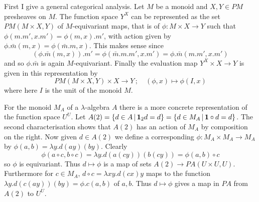 \documentclass[12pt, amstex, amssymb]{article}
\newcommand{\app}{{\bf 1}}
\begin{document}
First I give a general categorical analysis. Let $M$ be a monoid
and $X,Y \in PM$ presheaves on $M$. The function space
$Y^X$ can be represented as the set $PM(M \times X, Y)$ of
$M$-equivariant maps, that is of $\phi:M \times X \to Y$
such that $\phi(m.m',x.m') = \phi(m,x).m'$, with action given
by $\phi . \bar{m} (m,x) = \phi(\bar{m}.m,x)$. This makes sense
since
\[
(\phi.\bar{m}(m,x)).m' = \phi(\bar{m}.m.m',x.m') = \phi.\bar{m}(m.m',x.m')
\]
and so $\phi.\bar{m}$ is again $M$-equivariant. Finally the evaluation
map $Y^X \times X \to Y$ is given in this representation by
\[
PM(M \times X , Y ) \times X \to Y \, ; \quad (\phi , x) \mapsto 
\phi(I,x)
\]
where here $I$ is the unit of the monoid $M$.

For the monoid $M_A$ of
a $\lambda$-algebra $A$ there is a more concrete
representation of the function space $U^U$.
Let $A(2) = \{ d \in A \, | \, {\app}_2 d=d \} = 
\{d \in M_A \, | \, \app \circ d =d \}$. The second
characterisation shows that $A(2)$ has an action of $M_A$ by 
composition on the right.
Now given $d \in A(2)$ we define a corresponding 
$\phi : M_A \times M_A \to M_A$
by $\phi(a,b) = \lambda y. d(ay)(by)$. Clearly
\[
\phi(a\circ c, b \circ c) = \lambda y. d(a(cy))(b(cy)) = \phi(a,b) \circ c
\]
so $\phi$ is equivariant. Thus $d \mapsto \phi$ is a map of sets 
$A(2) \to PA(U \times U, U)$. Furthermore for $c \in M_A$, 
$d \circ c = \lambda xy.d(cx)y$ maps to the function
$\lambda y.d(c(ay))(by) = \phi.c(a,b)$ of $a,b$. Thus
$d \mapsto \phi$ gives a map in $PA$ from $A(2)$ to $U^U$.
\end{document}
